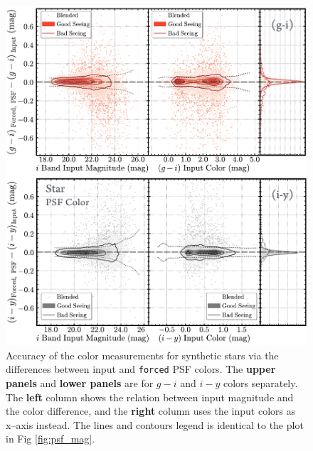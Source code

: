 \documentclass[useamsfonts]{pasj01}
\def\forced{\texttt{forced}}
\begin{document}
\begin{figure}
    \begin{center}
        \includegraphics[width=15cm]{fig/synpipe_psf_color}
    \end{center}
    \caption{
        Accuracy of the color measurements for synthetic stars via the differences
        between input and \forced{} PSF colors.
        The \textbf{upper panels} and \textbf{lower panels} are for $g-i$ and $i-y$
        colors separately.
        The \textbf{left} column shows the relation between input magnitude and
        the color difference, and the \textbf{right} column uses the input colors as
        x--axis instead.
        The lines and contours legend is identical to the plot in Fig \ref{fig:psf_mag}.
        }
    \label{fig:psf_color}
\end{figure}
\end{document}
